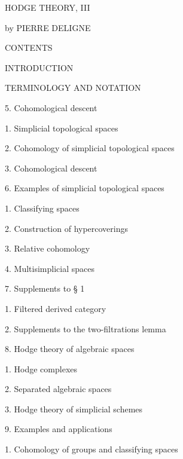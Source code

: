 \documentclass[11pt,twoside]{article}
\begin{document}
HODGE THEORY, III\par
by PIERRE DELIGNE\par
\par\medskip
CONTENTS\par
\par\medskip
INTRODUCTION\par
TERMINOLOGY AND NOTATION\par
5. Cohomological descent\par
\hspace*{1em}1. Simplicial topological spaces\par
\hspace*{1em}2. Cohomology of simplicial topological spaces\par
\hspace*{1em}3. Cohomological descent\par
6. Examples of simplicial topological spaces\par
\hspace*{1em}1. Classifying spaces\par
\hspace*{1em}2. Construction of hypercoverings\par
\hspace*{1em}3. Relative cohomology\par
\hspace*{1em}4. Multisimplicial spaces\par
7. Supplements to § 1\par
\hspace*{1em}1. Filtered derived category\par
\hspace*{1em}2. Supplements to the two-filtrations lemma\par
8. Hodge theory of algebraic spaces\par
\hspace*{1em}1. Hodge complexes\par
\hspace*{1em}2. Separated algebraic spaces\par
\hspace*{1em}3. Hodge theory of simplicial schemes\par
9. Examples and applications\par
\hspace*{1em}1. Cohomology of groups and classifying spaces\par
\end{document}
